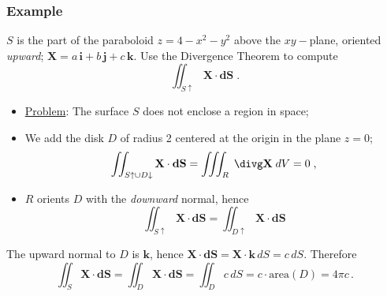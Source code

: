 \begin{frame}
  \frametitle{Example}

$S$ is the part of the paraboloid $z=4-x^2-y^2$ above the $xy-$plane, oriented \emph{upward}; $\textbf{X} = a\, \textbf{i} + b\, \textbf{j} + c\, \textbf{k}$. Use the Divergence Theorem to compute
%
$$\iint_{S\uparrow} \textbf{X} \cdot \textbf{dS} \; .$$
%

\begin{itemize}
  \item \pause \underline{Problem}: The surface $S$ does not enclose a region in space;
  \item \pause We add the disk $D$ of radius 2 centered at the origin in the plane $z=0$;
$$\iint_{S\uparrow \cup D\downarrow} \textbf{X} \cdot \textbf{dS} = \iint\!\!\!\int_R\; \divg \textbf{X} \; dV = 0\; ,$$
%
\item \pause $R$ orients $D$ with the \emph{downward} normal, hence
%
$$\iint_{S\uparrow} \textbf{X} \cdot \textbf{dS} = \iint_{D\uparrow} \textbf{X} \cdot \textbf{dS}$$
%
\end{itemize}

\pause The upward normal to $D$ is $\textbf{k}$, hence $\textbf{X}\cdot \textbf{dS}= \textbf{X}\cdot \textbf{k} \, dS= c\,dS$. Therefore
%
$$\iint_{S} \textbf{X} \cdot \textbf{dS} = \iint_{D} \textbf{X} \cdot \textbf{dS} = \iint_D c\, dS = c\cdot\text{area}(D) = 4\pi c\, .$$
\end{frame}